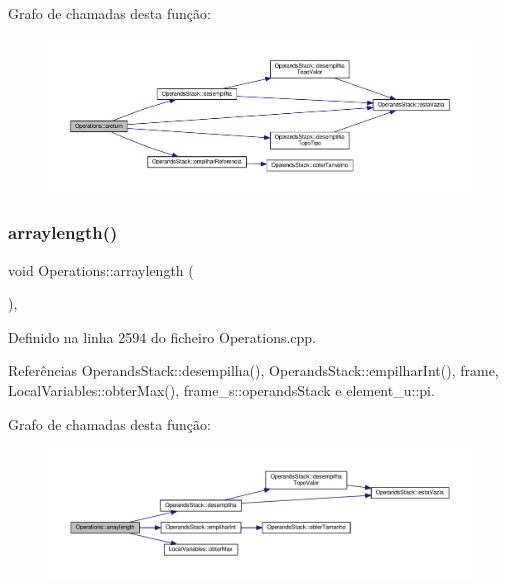 Grafo de chamadas desta função\+:\nopagebreak
\begin{figure}[H]
\begin{center}
\leavevmode
\includegraphics[width=350pt]{classOperations_a5829421b72f92d50dea0461953b26c5b_cgraph}
\end{center}
\end{figure}
\mbox{\label{classOperations_ae01c8bce2d6a583151dc0e46d1b8d52f}} 
\subsubsection{\texorpdfstring{arraylength()}{arraylength()}}
{\footnotesize\ttfamily void Operations\+::arraylength (\begin{DoxyParamCaption}{ }\end{DoxyParamCaption})\hspace{0.3cm}{\ttfamily [static]}, {\ttfamily [private]}}



Definido na linha 2594 do ficheiro Operations.\+cpp.



Referências Operands\+Stack\+::desempilha(), Operands\+Stack\+::empilhar\+Int(), frame, Local\+Variables\+::obter\+Max(), frame\+\_\+s\+::operands\+Stack e element\+\_\+u\+::pi.

Grafo de chamadas desta função\+:\nopagebreak
\begin{figure}[H]
\begin{center}
\leavevmode
\includegraphics[width=350pt]{classOperations_ae01c8bce2d6a583151dc0e46d1b8d52f_cgraph}
\end{center}
\end{figure}
\mbox{\label{classOperations_aa414424bd203fb9788712fd2e74c3a32}} 
